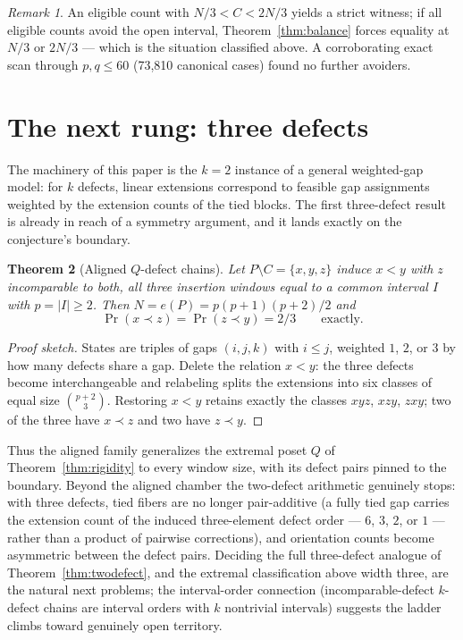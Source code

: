 \documentclass[11pt]{article}
\newtheorem{theorem}{Theorem}[section]
\theoremstyle{definition}
\theoremstyle{remark}
\newtheorem{remark}[theorem]{Remark}
\newcommand{\pr}{\operatorname{Pr}}
\begin{document}
\begin{remark}
An eligible count with $N/3<C<2N/3$ yields a strict witness; if all eligible counts avoid
the open interval, Theorem~\ref{thm:balance} forces equality at $N/3$ or $2N/3$ --- which
is the situation classified above. A corroborating exact scan through $p,q\le60$ (73{,}810
canonical cases) found no further avoiders. %
\end{remark}

\section{The next rung: three defects}
The machinery of this paper is the $k=2$ instance of a general weighted-gap model: for
$k$ defects, linear extensions correspond to feasible gap assignments weighted by the
extension counts of the tied blocks. The first three-defect result is already in reach of
a symmetry argument, and it lands exactly on the conjecture's boundary.

\begin{theorem}[Aligned $Q$-defect chains]
Let $P\setminus C=\{x,y,z\}$ induce $x<y$ with $z$ incomparable to both, all three
insertion windows equal to a common interval $I$ with $p=|I|\ge2$. Then
$N=e(P)=p(p+1)(p+2)/2$ and
\[
\pr(x\prec z)=\pr(z\prec y)=2/3\qquad\text{exactly.}
\]
\end{theorem}

\begin{proof}[Proof sketch]
States are triples of gaps $(i,j,k)$ with $i\le j$, weighted $1$, $2$, or $3$ by how many
defects share a gap. Delete the relation $x<y$: the three defects become interchangeable
and relabeling splits the extensions into six classes of equal size $\binom{p+2}{3}$.
Restoring $x<y$ retains exactly the classes $xyz$, $xzy$, $zxy$; two of the three have
$x\prec z$ and two have $z\prec y$.
\end{proof}

Thus the aligned family generalizes the extremal poset $Q$ of
Theorem~\ref{thm:rigidity} to every window size, with its defect pairs pinned to the
boundary. Beyond the aligned chamber the two-defect arithmetic genuinely stops: with
three defects, tied fibers are no longer pair-additive (a fully tied gap carries the
extension count of the induced three-element defect order --- $6$, $3$, $2$, or $1$ ---
rather than a product of pairwise corrections), and orientation counts become asymmetric
between the defect pairs. Deciding the full three-defect analogue of
Theorem~\ref{thm:twodefect}, and the extremal classification above width three, are the
natural next problems; the interval-order connection (incomparable-defect $k$-defect
chains are interval orders with $k$ nontrivial intervals) suggests the ladder climbs
toward genuinely open territory.
\end{document}
